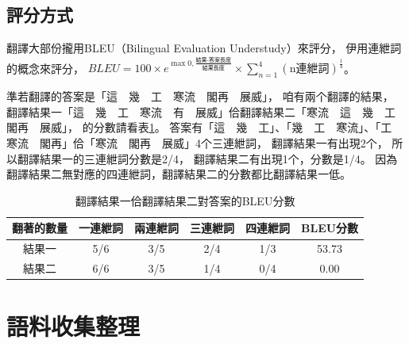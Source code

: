 \subsection{評分方式}
\label{小節：翻譯評分方式}

翻譯大部份攏用BLEU（Bilingual Evaluation Understudy）來評分，
伊用連紲詞的概念來評分，
$BLEU=100\times{e^{\max{0,\frac{\textit{結果-答案長度}}{\textit{結果長度}}}}}\times{\sum_{n=1}^{4}(\textrm{n連紲詞})^{\frac{1}{4}}}$\cite{BLEU程式}。

準若翻譯的答案是「這　幾　工　寒流　閣再　展威」，
咱有兩个翻譯的結果，
翻譯結果一「這　幾　工　寒流　有　展威」佮翻譯結果二「寒流　這　幾　工　閣再　展威」，
的分數請看表\ref{表：範例BLEU分數}。
答案有「這　幾　工」、「幾　工　寒流」、「工　寒流　閣再」佮「寒流　閣再　展威」4个三連紲詞，
翻譯結果一有出現2个，
所以翻譯結果一的三連紲詞分數是2/4，
翻譯結果二有出現1个，分數是1/4。
因為翻譯結果二無對應的四連紲詞，翻譯結果二的分數都比翻譯結果一低。

\begin{table}
\caption{翻譯結果一佮翻譯結果二對答案的BLEU分數}
\label{表：範例BLEU分數}
\centering
\begin{tabular}{|c|cccc|c|}
\hline
翻著的數量 & 一連紲詞 & 兩連紲詞 & 三連紲詞 & 四連紲詞 & BLEU分數\\
\hline
結果一 & 5/6 & 3/5 & 2/4 & 1/3 & 53.73\\
\hline
結果二 & 6/6 & 3/5 & 1/4 & 0/4 & 0.00\\
\hline
\end{tabular}
\end{table}

\section{語料收集整理}
\label{節：語料收集整理}
%
%
%

